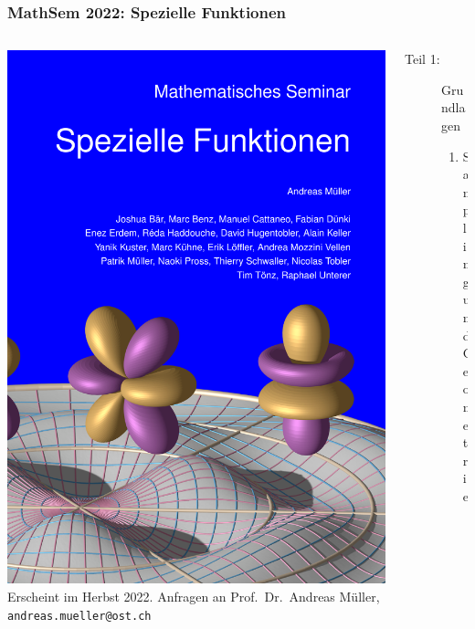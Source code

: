 \documentclass[handout]{beamer}
\title[]{}
\begin{document}
\begin{frame}
\frametitle{%
MathSem 2022: Spezielle Funktionen}
\begin{columns}[onlytextwidth]
\begin{column}{0.31\textwidth}
\includegraphics[width=\hsize]{../cover/buchcover.png}
\vskip 0.2cm
\bigskip
\bigskip
Erscheint im Herbst 2022.
Anfragen an
Prof.~Dr.~Andreas Müller,
{\texttt{andreas.mueller@ost.ch}}
\bigskip
\bigskip
\bigskip
\end{column}
\begin{column}{0.67\textwidth}
\begin{description}
\item[Teil 1:] Grundlagen
\begin{enumerate}
\item Sampling und Geometrie

\end{enumerate}
\end{description}
\end{column}
\end{columns}
\end{frame}
\end{document}
